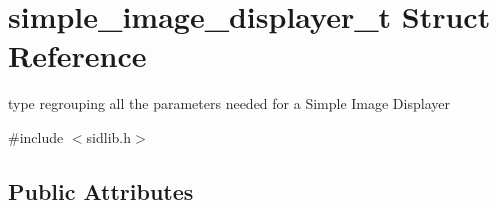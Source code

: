 \hypertarget{structsimple__image__displayer__t}{}\section{simple\+\_\+image\+\_\+displayer\+\_\+t Struct Reference}
\label{structsimple__image__displayer__t}


type regrouping all the parameters needed for a Simple Image Displayer  




{\ttfamily \#include $<$sidlib.\+h$>$}

\subsection*{Public Attributes}
